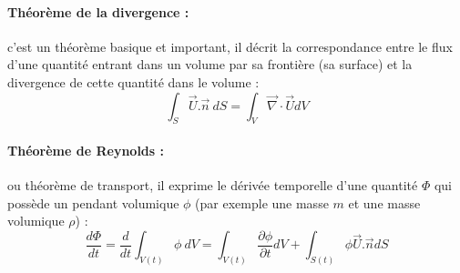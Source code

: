 \paragraph{Théorème de la divergence :}c'est un théorème basique et important, il décrit la correspondance entre le flux d'une quantité entrant dans un volume par sa frontière (sa surface) et la divergence de cette quantité dans le volume :
%
\begin{equation}
    \int_{S} {\vec{U}.\vec{n}~dS} = \int_{V} { \vec{\nabla} \cdot \vec{U} dV }
\end{equation}

\paragraph{Théorème de Reynolds :}ou théorème de transport, il exprime le dérivée temporelle d'une quantité $\Phi$ qui possède un pendant volumique $\phi$ (par exemple une masse $m$ et une masse volumique $\rho$) :
%
\begin{equation}
    \frac{d\Phi}{dt}
    = \frac{d}{dt} \int_{V(t)} \phi~dV
    = \int_{V(t)} \frac{\partial \phi}{\partial t} dV
    + \int_{S(t)} \phi \vec{U}.\vec{n} dS
\end{equation}

